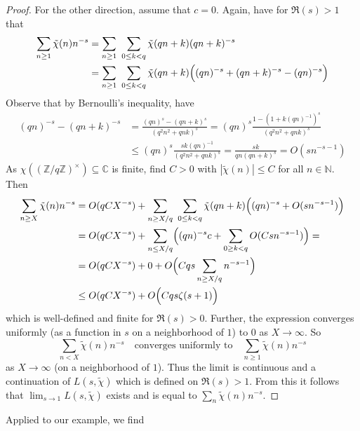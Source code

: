 \documentclass{scrartcl}
\newcommand{\N}{\mathbb{N}}
\newcommand{\Z}{\mathbb{Z}}
\newcommand{\C}{\mathbb{C}}
\newcommand{\units}{\times}
\begin{document}
\begin{proof}
    For the other direction, assume that $c = 0$.
    Again, have for $\Re(s) > 1$ that
    \begin{align*}
        \sum_{n \geq 1} \tilde{\chi}(n) n^{-s} &= \sum_{n \geq 1} \ \sum_{0 \leq k < q} \tilde{\chi}(qn + k) (qn + k)^{-s} \\
        &= \sum_{n \geq 1} \ \sum_{0 \leq k < q} \tilde{\chi}(qn + k) \Bigl( (qn)^{-s} + (qn + k)^{-s} - (qn)^{-s} \Bigr)
    \end{align*}
    Observe that by Bernoulli's inequality, have
    \begin{align*}
        (qn)^{-s} - (qn + k)^{-s} &= \frac {(qn)^s - (qn + k)^s} {(q^2n^2 + qnk)^s} = (qn)^{s} \frac {1 - (1 + k(qn)^{-1})^s} {(q^2n^2 + qnk)^s} \\
        &\leq (qn)^s \frac {sk(qn)^{-1}} {(q^2n^2 + qnk)^s} = \frac {sk} {qn(qn + k)^s} = O(sn^{-s - 1})
    \end{align*}
    As $\chi((\Z/q\Z)^\units) \subseteq \C$ is finite, find $C > 0$ with $|\tilde{\chi}(n)| \leq C$ for all $n \in \N$. Then
    \begin{align*}
        \sum_{n \geq X} \tilde{\chi}(n) n^{-s} &= O(qCX^{-s}) + \sum_{n \geq X/q} \ \sum_{0 \leq k < q} \tilde{\chi}(qn + k) \Bigl( (qn)^{-s} + O(sn^{-s - 1}) \Bigr) \\
        &= O(qCX^{-s}) + \sum_{n \leq X/q} \Bigl( (qn)^{-s} c + \sum_{0 \geq k < q} O(Csn^{-s - 1}) \Bigr) = \\
        &= O(qCX^{-s}) + 0 + O\Bigl( Cqs \sum_{n \geq X/q} n^{-s - 1} \Bigr) \\
        &\leq O(qCX^{-s}) + O\Bigl( Cqs\zeta(s + 1) \Bigr)
    \end{align*}
    which is well-defined and finite for $\Re(s) > 0$.
    Further, the expression converges uniformly (as a function in $s$ on a neighborhood of $1$) to $0$ as $X \to \infty$. 
    So
    \begin{equation*}
        \sum_{n < X} \tilde{\chi}(n) n^{-s} \quad \text{converges uniformly to} \quad \sum_{n \geq 1} \tilde{\chi}(n) n^{-s}
    \end{equation*}
    as $X \to \infty$ (on a neighborhood of $1$). 
    Thus the limit is continuous and a continuation of $L(s, \tilde{\chi})$ which is defined on $\Re(s) > 1$.
    From this it follows that $\lim_{s \to 1} L(s, \tilde{\chi})$ exists and is equal to $\sum_n \tilde{\chi}(n) n^{-s}$.
\end{proof}
Applied to our example, we find
\end{document}
